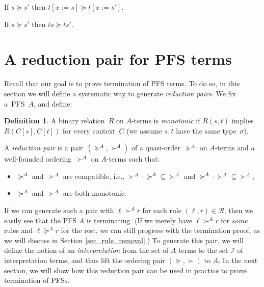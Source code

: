 \documentclass[a4paper,UKenglish,cleveref,autoref,numberwithinsect]{lipics-v2019}
\theoremstyle{definition}
\newtheorem{defn}[theorem]{Definition}
\newcommand{\Rules}{\mathcal{R}}
\newcommand{\Iterms}{\mathcal{I}}
\newcommand{\subst}[2]{#1:=#2}
\begin{document}
\begin{lemma}\label{lem_succeq_subst}
  If $s \succeq s'$ then $t[\subst{x}{s}] \succeq t[\subst{x}{s'}]$.
\end{lemma}

\begin{corollary}\label{cor_app_wm}
  If $s \succeq s'$ then $t s \succeq t s'$.
\end{corollary}


\section{A reduction pair for PFS terms}\label{sec_reduction_pairs}

Recall that our goal is to prove termination of PFS terms.  To
do so, in this section we will define a systematic way to generate
\emph{reduction pairs}. We fix a~PFS~$A$, and define:

\begin{defn}
  A binary relation~$R$ on $A$-terms is \emph{monotonic} if $R(s, t)$
  implies $R(C[s], C[t])$ for every context~$C$ (we assume $s,t$ have
  the same type~$\sigma$).

  A \emph{reduction pair} is a pair~$(\succeq^A,\succ^A)$ of a
  quasi-order~$\succeq^A$ on $A$-terms and a well-founded
  ordering~$\succ^A$ on $A$-terms such that:
  \begin{itemize}
  \item $\succeq^A$ and~$\succ^A$ are compatible, i.e., ${\succ^A}
    \cdot {\succeq^A} \subseteq {\succ^A}$ and ${\succeq^A} \cdot
          {\succ^A} \subseteq {\succ^A}$,
  \item $\succeq^A$ and~$\succ^A$ are both monotonic.
  \end{itemize}
\end{defn}


If we can generate such a pair with $\ell \succ^A r$ for each
rule $(\ell,r) \in \Rules$, then we easily see that the PFS $A$ is
terminating.  (If we merely have $\ell \succ^A r$ for \emph{some}
rules and $\ell \succeq^A r$ for the rest, we can still progress
with the termination proof, as we will discuss in Section
\ref{sec_rule_removal}.)
To generate this pair, we will define the notion of an
\emph{interpretation} from the set of $A$-terms to the set $\Iterms$ of
interpretation terms, and thus lift the ordering pair $(\succeq,\succ)$
to $A$.
In the next section, we will show how this reduction pair can be used
in practice to prove termination of PFSs.
\end{document}

